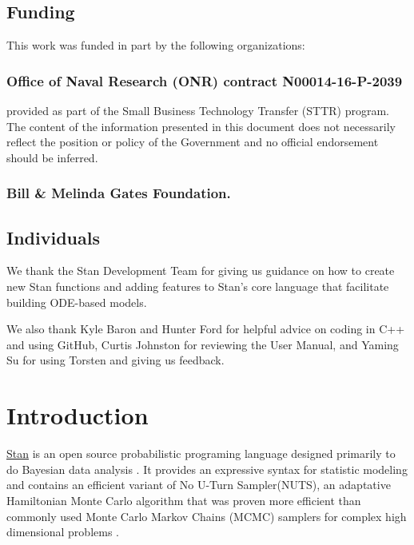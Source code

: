 \documentclass[12pt, reqno, oneside]{amsbook}
\numberwithin{equation}{chapter}
\numberwithin{figure}{chapter}
\numberwithin{table}{chapter}
\theoremstyle{remark}
\begin{document}
\section*{Funding}
\label{sec:org1bad1f4}
This work was funded in part by the following organizations:
\subsection*{Office of Naval Research (ONR) contract N00014-16-P-2039}
\label{sec:org228195e}
provided as part of the Small Business Technology Transfer (STTR)
program. The content of the information presented in this document
does not necessarily reflect the position or policy of the
Government and no official endorsement should be inferred.
\subsection*{Bill \& Melinda Gates Foundation.}
\label{sec:orga901041}
\section*{Individuals}
\label{sec:org87098de}
We thank the Stan Development Team for giving us guidance on how to
create new Stan functions and adding features to Stan's core language
that facilitate building ODE-based models.

We also thank Kyle Baron and Hunter Ford for helpful advice on coding
in C++ and using GitHub, Curtis Johnston for reviewing the User
Manual, and Yaming Su for using Torsten and giving us feedback.
\chapter{Introduction}
\label{sec:orgc21e46a}
\href{https://mc-stan.org/}{Stan} is an open source probabilistic programing language designed
primarily to do Bayesian data analysis
\cite{carpenter17_stan}. It provides an expressive syntax for statistic
modeling and contains an efficient variant of No U-Turn
Sampler(NUTS), an adaptative Hamiltonian Monte Carlo
algorithm that was proven more efficient than commonly used Monte Carlo Markov Chains
(MCMC) samplers for complex high dimensional problems \cite{hoffman_no-u-turn_2011,betancourt_hmc_2018}.
\end{document}

